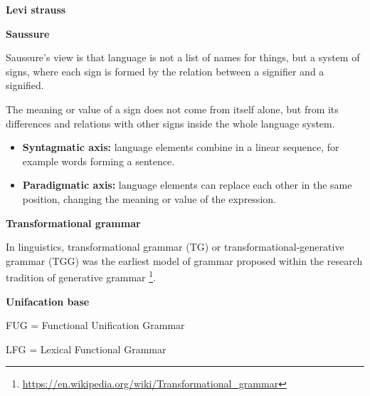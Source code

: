 \documentclass{book}
\providecommand{\ProjectDeepHeading}[2]{%
    \par\medskip\noindent\textbf{#2}\par\smallskip
}
\providecommand{\seeherefooter}[1]{\footnote{\url{#1}}}
\begin{document}
\ProjectDeepHeading{7}{Levi strauss}



\ProjectDeepHeading{7}{Saussure}


Saussure’s view \cite{saussure-1966-course-in-general-linguistics} is that language is not a list of names for things, but a system of signs, where each sign is formed by the relation between a signifier and a signified.
    
    The meaning or value of a sign does not come from itself alone, but from its differences and relations with other signs inside the whole language system.
    
    \begin{itemize}
        \item \textbf{Syntagmatic axis:} language elements combine in a linear sequence, for example words forming a sentence.
        \item \textbf{Paradigmatic axis:} language elements can replace each other in the same position, changing the meaning or value of the expression.
    \end{itemize}

\ProjectDeepHeading{6}{Transformational grammar}


In linguistics, transformational grammar (TG) or transformational-generative grammar (TGG) was the earliest model of grammar proposed within the research tradition of generative grammar \seeherefooter{https://en.wikipedia.org/wiki/Transformational_grammar}.

\ProjectDeepHeading{6}{Unifacation base}


FUG  = Functional Unification Grammar
    
    LFG  = Lexical Functional Grammar
    
\end{document}
